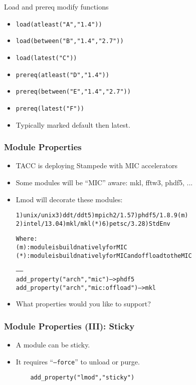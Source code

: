 \documentclass[dvipsnames,aspectratio=169]{beamer}
\begin{document}
\begin{frame}{Load and prereq modify functions}
  \begin{itemize}
    \item \texttt{load(atleast("A","1.4"))}
    \item \texttt{load(between("B","1.4","2.7"))}
    \item \texttt{load(latest("C"))}
    \item \texttt{prereq(atleast("D","1.4"))}
    \item \texttt{prereq(between("E","1.4","2.7"))}
    \item \texttt{prereq(latest("F"))}
    \item Typically marked default then latest.
  \end{itemize}
\end{frame}

\begin{frame}[fragile]
    \frametitle{Module Properties}
  \begin{itemize}
    \item TACC is deploying Stampede with MIC accelerators
    \item Some modules will be ``MIC'' aware: mkl, fftw3, phdf5, ...
    \item Lmod will decorate these modules:
  {\tiny
    \begin{alltt}
  1) unix/unix     3) ddt/ddt       5) mpich2/1.5    7) phdf5/1.8.9 {\color{blue}(m)}
  2) intel/13.0    4) mkl/mkl {\color{red}(*)}   6) petsc/3.2     8) StdEnv

  Where:
   {\color{blue}(m)}:  module is build natively for MIC
   {\color{red}(*)}:  module is build natively for MIC and offload to the MIC

   ------
   add_property("arch","mic")              -- \textgreater phdf5
   add_property("arch","mic:offload")      -- \textgreater mkl
    \end{alltt}
}
  \item What properties would you like to support?
  \end{itemize}
\end{frame}


\begin{frame}[fragile]
    \frametitle{Module Properties (III): Sticky}
  \begin{itemize}
    \item A module can be sticky.
    \item It requires ``\texttt{--force}'' to unload or purge.
    {\small
\begin{verbatim}
    add_property("lmod","sticky")
\end{verbatim}
}
  \end{itemize}
\end{frame}
\end{document}
